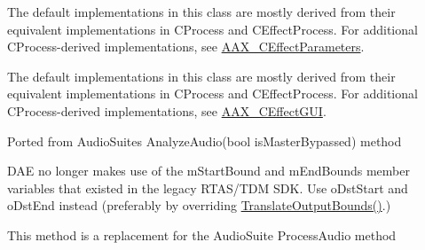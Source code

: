 
\begin{DoxyRefList}
\item[\label{a00385__porting_notes000005}%
\hypertarget{a00385__porting_notes000005}{}%
Class \hyperlink{a00017}{A\+A\+X\+\_\+\+C\+Effect\+G\+U\+I} ]The default implementations in this class are mostly derived from their equivalent implementations in C\+Process and C\+Effect\+Process. For additional C\+Process-\/derived implementations, see \hyperlink{a00018}{A\+A\+X\+\_\+\+C\+Effect\+Parameters}. 
\item[\label{a00385__porting_notes000006}%
\hypertarget{a00385__porting_notes000006}{}%
Class \hyperlink{a00018}{A\+A\+X\+\_\+\+C\+Effect\+Parameters} ]The default implementations in this class are mostly derived from their equivalent implementations in C\+Process and C\+Effect\+Process. For additional C\+Process-\/derived implementations, see \hyperlink{a00017}{A\+A\+X\+\_\+\+C\+Effect\+G\+U\+I}. 
\item[\label{a00385__porting_notes000009}%
\hypertarget{a00385__porting_notes000009}{}%
Member \hyperlink{a00020_adec65f5e13856b0bfcb3fbe9200213cf}{A\+A\+X\+\_\+\+C\+Host\+Processor\+:\+:Analyze\+Audio} (const float $\ast$const in\+Audio\+Ins\mbox{[}\mbox{]}, int32\+\_\+t in\+Audio\+In\+Count, int32\+\_\+t $\ast$io\+Window\+Size) A\+A\+X\+\_\+\+O\+V\+E\+R\+R\+I\+D\+E]Ported from Audio\+Suite\textquotesingle{}s {\ttfamily Analyze\+Audio}(bool {\ttfamily is\+Master\+Bypassed}) method 
\item[\label{a00385__porting_notes000007}%
\hypertarget{a00385__porting_notes000007}{}%
Member \hyperlink{a00020_a79ef65fd98f14144beb708061fba884e}{A\+A\+X\+\_\+\+C\+Host\+Processor\+:\+:Init\+Output\+Bounds} (int64\+\_\+t i\+Src\+Start, int64\+\_\+t i\+Src\+End, int64\+\_\+t $\ast$o\+Dst\+Start, int64\+\_\+t $\ast$o\+Dst\+End) A\+A\+X\+\_\+\+O\+V\+E\+R\+R\+I\+D\+E]D\+A\+E no longer makes use of the m\+Start\+Bound and m\+End\+Bounds member variables that existed in the legacy R\+T\+A\+S/\+T\+D\+M S\+D\+K. Use {\ttfamily o\+Dst\+Start} and {\ttfamily o\+Dst\+End} instead (preferably by overriding \hyperlink{a00020_a4d793e60071069e6f98c4d841d37ac96}{Translate\+Output\+Bounds()}.) 
\item[\label{a00385__porting_notes000008}%
\hypertarget{a00385__porting_notes000008}{}%
Member \hyperlink{a00020_ab8fd8661bd7f58d9e771cd4c37a17f8f}{A\+A\+X\+\_\+\+C\+Host\+Processor\+:\+:Render\+Audio} (const float $\ast$const in\+Audio\+Ins\mbox{[}\mbox{]}, int32\+\_\+t in\+Audio\+In\+Count, float $\ast$const i\+Audio\+Outs\mbox{[}\mbox{]}, int32\+\_\+t i\+Audio\+Out\+Count, int32\+\_\+t $\ast$io\+Window\+Size) A\+A\+X\+\_\+\+O\+V\+E\+R\+R\+I\+D\+E]This method is a replacement for the Audio\+Suite {\ttfamily Process\+Audio} method 

\end{DoxyRefList}
